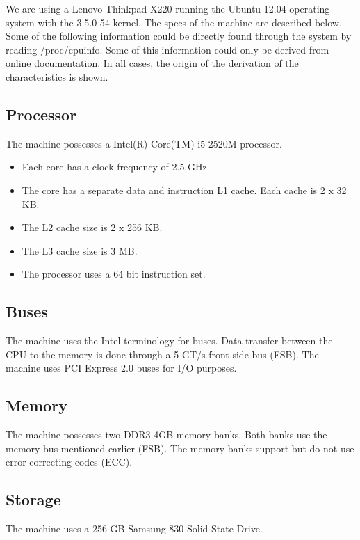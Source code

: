 We are using a Lenovo Thinkpad X220 running the Ubuntu 12.04 operating system with the 3.5.0-54 kernel. The specs of the machine are described below. Some of the following information could be directly found through the system by reading /proc/cpuinfo. Some of this information could only be derived from online documentation. In all cases, the origin of the derivation of the characteristics is shown.

\subsection{Processor}
The machine possesses a Intel(R) Core(TM) i5-2520M processor. 

\begin{itemize}
    \item{Each core has a clock frequency of 2.5 GHz}
    \item{The core has a separate data and instruction L1 cache. Each cache is 2 x 32 KB.}
\item{The L2 cache size is 2 x 256 KB.}
\item{The L3 cache size is 3 MB.}
\item{The processor uses a 64 bit instruction set.}
\end{itemize}

\subsection{Buses}

The machine uses the Intel terminology for buses. Data transfer between the CPU to the memory is done through a 5 GT/s front side bus (FSB). The machine uses PCI Express 2.0 buses for I/O purposes.

\subsection{Memory}

The machine possesses two DDR3 4GB memory banks. Both banks use the memory bus mentioned earlier (FSB). The memory banks support but do not use error correcting codes (ECC). 

\subsection{Storage}

The machine uses a 256 GB Samsung 830 Solid State Drive. 

